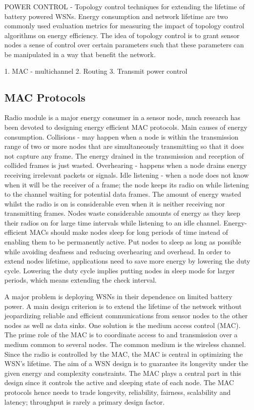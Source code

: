 POWER CONTROL - Topology control techniques for extending the lifetime of battery powered WSNs. Energy consumption and network lifetime are two commonly used evaluation metrics for measuring the impact of topology control algorithms on energy efficiency. The idea of topology control is to grant sensor nodes a sense of control over certain parameters such that these parameters can be manipulated in a way that benefit the network. \cite{azrinasurvey}

1. MAC - multichannel
2. Routing
3. Transmit power control

\subsection{MAC Protocols}
Radio module is a major energy consumer in a sensor node, much research has been devoted to designing energy efficient MAC protocols.
Main causes of energy consumption. Collisions - may happen when a node is within the transmission range of two or more nodes that are simultaneously transmitting so that it does not capture any frame. The energy drained in the transmission and reception of collided frames is just wasted. Overhearing - happens when a node drains energy receiving irrelevant packets or signals. Idle listening - when a node does not know when it will be the receiver of a frame; the node keeps its radio on while listening to the channel waiting for potential data frames. The amount of energy wasted whilst the radio is on is considerable even when it is neither receiving nor transmitting frames. Nodes waste considerable amounts of energy as they keep their radios on for large time intervals while listening to an idle channel. Energy-efficient MACs should make nodes sleep for long periods of time instead of enabling them to be permanently active. Put nodes to sleep as long as possible while avoiding deafness and reducing overhearing and overhead. In order to extend nodes lifetime, applications need to save more energy by lowering the duty cycle. Lowering the duty cycle implies putting nodes in sleep mode for larger periods, which means extending the check interval. \cite{macsurvey}

A major problem is deploying WSNs in their dependence on limited battery power. A main design criterion is to extend the lifetime of the network without jeopardizing reliable and efficient communications from sensor nodes to the other nodes as well as data sinks. One solution is the medium access control (MAC). The prime role of the MAC is to coordinate access to and transmission over a medium common to several nodes. The common medium is the wireless channel. Since the radio is controlled by the MAC, the MAC is central in optimizing the WSN's lifetime. The aim of a WSN design is to guarantee its longevity under the given energy and complexity constraints. The MAC plays a central part in this design since it controls the active and sleeping state of each node. The MAC protocols hence needs to trade longevity, reliability, fairness, scalability and latency; throughput is rarely a primary design factor. \cite{macsurvey}

